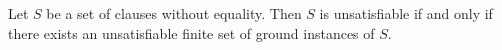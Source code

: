 \begin{corollary}
	Let $S$ be a set of clauses without equality. 
	Then $S$ is unsatisfiable if and only if there exists 
	an unsatisfiable finite set of ground instances of $S$.
\end{corollary}

%


